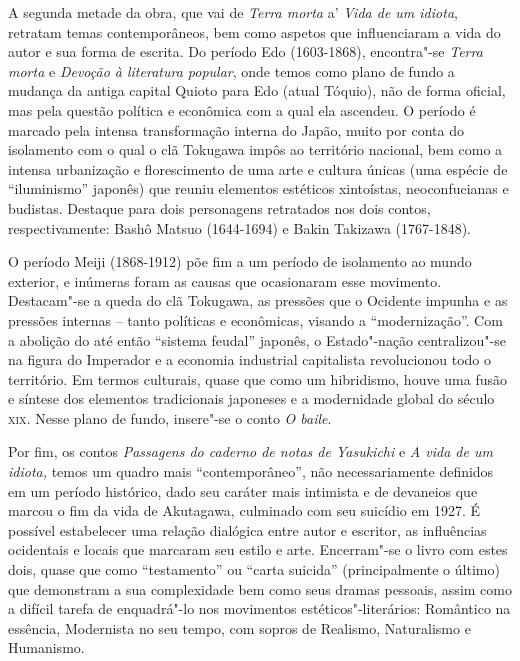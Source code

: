 \documentclass[12pt]{extarticle}
\begin{document}


A segunda metade da obra, que vai de \emph{Terra morta} a' \emph{Vida de um
idiota}, retratam temas contemporâneos, bem como aspetos que influenciaram a
vida do autor e sua forma de escrita. Do período Edo (1603-1868), encontra"-se
\emph{Terra morta} e \emph{Devoção à literatura popular}, onde temos como plano
de fundo a mudança da antiga capital Quioto para Edo (atual Tóquio), não de
forma oficial, mas pela questão política e econômica com a qual ela ascendeu. O
período é marcado pela intensa transformação interna do Japão, muito por conta
do isolamento com o qual o clã Tokugawa impôs ao território nacional, bem como
a intensa urbanização e florescimento de uma arte e cultura únicas (uma espécie
de ``iluminismo'' japonês) que reuniu elementos estéticos xintoístas,
neoconfucianas e budistas. Destaque para dois personagens retratados nos dois
contos, respectivamente: Bashô Matsuo (1644-1694) e Bakin Takizawa (1767-1848).

O período Meiji (1868-1912) põe fim a um período de isolamento ao mundo
exterior, e inúmeras foram as causas que ocasionaram esse movimento.
Destacam"-se a queda do clã Tokugawa, as pressões que o Ocidente impunha e as
pressões internas -- tanto políticas e econômicas, visando a ``modernização''.
Com a abolição do até então ``sistema feudal'' japonês, o Estado"-nação
centralizou"-se na figura do Imperador e a economia industrial capitalista
revolucionou todo o território. Em termos culturais, quase que como um
hibridismo, houve uma fusão e síntese dos elementos tradicionais japoneses e a
modernidade global do século \textsc{xix}. Nesse plano de fundo, insere"-se o
conto \emph{O baile}.

Por fim, os contos \emph{Passagens do caderno de notas de Yasukichi} e \emph{A
vida de um idiota,} temos um quadro mais ``contemporâneo'', não necessariamente
definidos em um período histórico, dado seu caráter mais intimista e de
devaneios que marcou o fim da vida de Akutagawa, culminado com seu suicídio em
1927. É possível estabelecer uma relação dialógica entre autor e escritor, as
influências ocidentais e locais que marcaram seu estilo e arte. Encerram"-se o
livro com estes dois, quase que como ``testamento'' ou ``carta suicida''
(principalmente o último) que demonstram a sua complexidade bem como seus
dramas pessoais, assim como a difícil tarefa de enquadrá"-lo nos movimentos
estéticos"-literários: Romântico na essência, Modernista no seu tempo, com
sopros de Realismo, Naturalismo e Humanismo.
\end{document}
